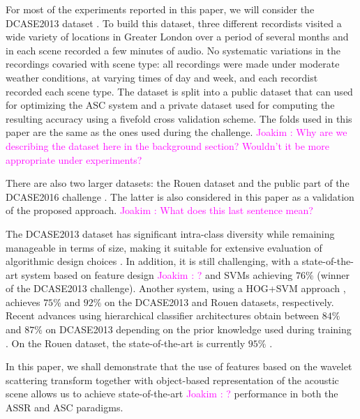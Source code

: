 \documentclass[journal]{IEEEtran}
\newcommand{\ja}[1]{\textcolor{magenta}{Joakim : #1}}
\begin{document}

For most of the experiments reported in this paper, we will consider the DCASE2013 dataset \cite{giannoulis2013database, 7100934}. To build this dataset, three different recordists visited a wide variety of locations in Greater London over
a period of several months and in each
scene recorded a few minutes of audio. No
systematic variations in the recordings covaried with scene
type: all recordings were made under moderate weather conditions, at varying times of day and week, and each recordist recorded each scene type.
The dataset is split into a public dataset that can used for optimizing the ASC system and a private dataset used for computing the resulting accuracy using a fivefold cross validation scheme. The folds used in this paper are the same as the ones used during the challenge. \ja{Why are we describing the dataset here in the background section? Wouldn't it be more appropriate under experiments?}

There are also two larger datasets: the
Rouen dataset \cite{rakotomamonjy2015histogram} and the public part of the DCASE2016 challenge \cite{Mesaros2016_EUSIPCO}. The latter is also considered in this paper as a validation of the proposed approach. \ja{What does this last sentence mean?}

The DCASE2013 dataset has significant intra-class diversity while remaining manageable in terms of size, making it suitable for extensive evaluation of algorithmic design choices \cite{lagrange:hal-01082501}. In addition, it is still challenging, with a state-of-the-art system based on feature design \ja{?} and SVMs achieving $76\%$ \cite{roma2013} (winner of the DCASE2013 challenge). Another system, using a HOG+SVM approach \cite{rakotomamonjy2015histogram}, achieves $75\%$ and $92\%$ on the DCASE2013 and Rouen datasets, respectively. Recent advances using hierarchical classifier architectures obtain between $84\%$ and $87\%$ on DCASE2013 depending on the prior knowledge used during training \cite{phan2016label}. On the Rouen dataset, the state-of-the-art is currently $95\%$ \cite{bisot2016acoustic}.

In this paper, we shall demonstrate that the use of features based on the wavelet scattering transform together with object-based representation of the acoustic scene allows us to achieve state-of-the-art \ja{?} performance in both the ASSR and ASC paradigms.
\end{document}
